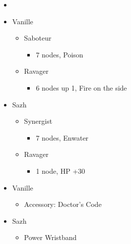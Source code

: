 \begin{paracol}{2}
\begin{menu}
\begin{itemize}
    \paradigm
    \begin{itemize}
        \item {}%
{\paradigmline{\rav}{\com}{}}%
{\paradigmline[2]{\textit{\sab}}{\textit{\syn}}{}}%
{\paradigmline{(\sab)}{\syn}{}}%
{\paradigmline{\rav}{\rav}{}}%
{\paradigmline{[\sab]}{(\rav)}{}}%
{\paradigmline{[\sab]}{\com}{}}
    \end{itemize}
    \crystarium
    \begin{itemize}
        \item Vanille
        \begin{itemize}
            \item Saboteur
            \begin{itemize}
                \item 7 nodes, Poison
            \end{itemize}
            \item Ravager
            \begin{itemize}
                \item 6 nodes up 1, Fire on the side
            \end{itemize}
        \end{itemize}
        \item Sazh
        \begin{itemize}
            \item Synergist
            \begin{itemize}
                \item 7 nodes, Enwater
            \end{itemize}
            \item Ravager
            \begin{itemize}
                \item 1 node, HP +30
            \end{itemize}
        \end{itemize}
    \end{itemize}
    \equip
    \begin{itemize}
        \item Vanille
        \begin{itemize}
                \item Accessory: Doctor's Code
        \end{itemize}
        \item Sazh
        \begin{itemize}
                \item Power Wristband
        \end{itemize}
    \end{itemize}
\end{itemize}
\end{menu}


\end{paracol}
